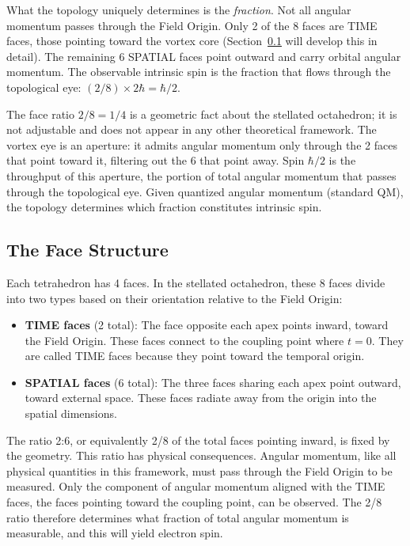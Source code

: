 \documentclass[aps,prd,preprint,superscriptaddress,showpacs,preprintnumbers,amsmath,amssymb,nofootinbib]{revtex4-2}
\begin{document}
What the topology uniquely determines is the \emph{fraction}. Not all angular momentum passes through the Field Origin. Only 2 of the 8 faces are TIME faces, those pointing toward the vortex core (Section~\ref{subsec:faces} will develop this in detail). The remaining 6 SPATIAL faces point outward and carry orbital angular momentum. The observable intrinsic spin is the fraction that flows through the topological eye: $(2/8) \times 2\hbar = \hbar/2$.

The face ratio $2/8 = 1/4$ is a geometric fact about the stellated octahedron; it is not adjustable and does not appear in any other theoretical framework. The vortex eye is an aperture: it admits angular momentum only through the 2 faces that point toward it, filtering out the 6 that point away. Spin $\hbar/2$ is the throughput of this aperture, the portion of total angular momentum that passes through the topological eye. Given quantized angular momentum (standard QM), the topology determines which fraction constitutes intrinsic spin.

\subsection{The Face Structure}
\label{subsec:faces}

Each tetrahedron has 4 faces. In the stellated octahedron, these 8 faces divide into two types based on their orientation relative to the Field Origin:

\begin{itemize}
\item \textbf{TIME faces} (2 total): The face opposite each apex points inward, toward the Field Origin. These faces connect to the coupling point where $t = 0$. They are called TIME faces because they point toward the temporal origin.
\item \textbf{SPATIAL faces} (6 total): The three faces sharing each apex point outward, toward external space. These faces radiate away from the origin into the spatial dimensions.
\end{itemize}

The ratio 2:6, or equivalently 2/8 of the total faces pointing inward, is fixed by the geometry. This ratio has physical consequences. Angular momentum, like all physical quantities in this framework, must pass through the Field Origin to be measured. Only the component of angular momentum aligned with the TIME faces, the faces pointing toward the coupling point, can be observed. The 2/8 ratio therefore determines what fraction of total angular momentum is measurable, and this will yield electron spin.
\end{document}
